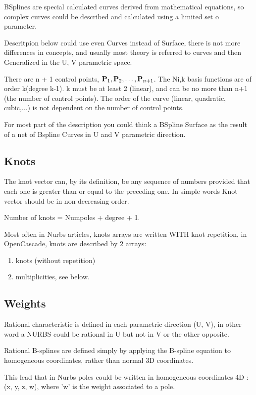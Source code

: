 \documentclass[a4paper]{article}
\begin{document}
BSplines are special calculated curves derived from mathematical equations, so complex curves could be described and calculated using a limited set o parameter.

Descritpion below could use even Curves instead of Surface, there is not more differences in concepts, and usually most theory is referred to curves and then Generalized in the U, V parametric space.

There are n + 1 control points, ${\bf P}_1, {\bf P}_2, \ldots, {\bf P}_{n+1}$. The Ni,k basis functions are of order k(degree k-1). k must be at least 2 (linear), and can be no more than n+1 (the number of control points). The order of the curve (linear, quadratic, cubic,...) is not dependent on the number of control points.

For most part of the description you could think a BSpline Surface as the result of a net of Bspline Curves in U and V parametric direction.

\subsection{Knots}
The knot vector can, by its definition, be any sequence of numbers provided that each one is greater than or equal to the preceding one. In simple words Knot vector should be in non decreasing order.

Number of knots = Numpoles + degree + 1.

Most often in Nurbs articles, knots arrays are written WITH knot repetition, in OpenCascade, knots are described by 2 arrays:
\begin{enumerate}
  \item knots (without repetition)
  \item multiplicities, see below.
\end{enumerate}


\subsection{Weights}
Rational characteristic is defined in each parametric direction (U, V), in other word a NURBS could be rational in U but not in V or the other opposite.

Rational B-splines are defined simply by applying the B-spline equation to homogeneous coordinates, rather than normal 3D coordinates.

This lead that in Nurbs poles could be written in homogeneous coordinates 4D : (x, y, z, w), where 'w' is the weight associated to a pole.
\smallskip
\end{document}
